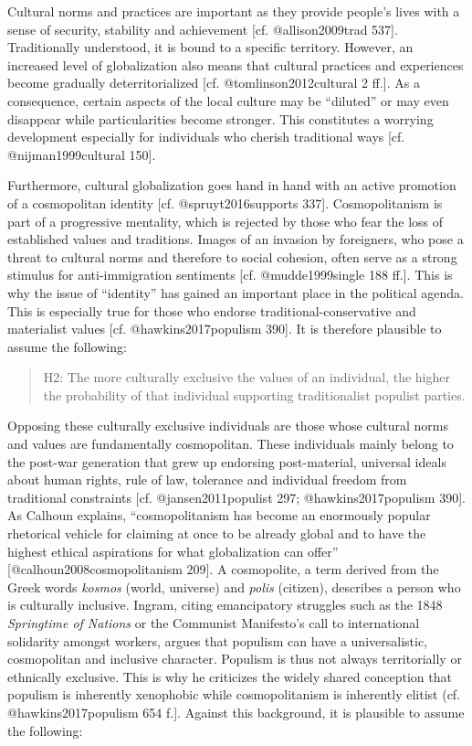 \documentclass[]{article}
\begin{document}
Cultural norms and practices are important as they provide people's
lives with a sense of security, stability and achievement {[}cf.
@allison2009trad 537{]}. Traditionally understood, it is bound to a
specific territory. However, an increased level of globalization also
means that cultural practices and experiences become gradually
deterritorialized {[}cf. @tomlinson2012cultural 2 ff.{]}. As a
consequence, certain aspects of the local culture may be ``diluted'' or
may even disappear while particularities become stronger. This
constitutes a worrying development especially for individuals who
cherish traditional ways {[}cf. @nijman1999cultural 150{]}.

Furthermore, cultural globalization goes hand in hand with an active
promotion of a cosmopolitan identity {[}cf. @spruyt2016supports 337{]}.
Cosmopolitanism is part of a progressive mentality, which is rejected by
those who fear the loss of established values and traditions. Images of
an invasion by foreigners, who pose a threat to cultural norms and
therefore to social cohesion, often serve as a strong stimulus for
anti-immigration sentiments {[}cf. @mudde1999single 188 ff.{]}. This is
why the issue of ``identity'' has gained an important place in the
political agenda. This is especially true for those who endorse
traditional-conservative and materialist values {[}cf.
@hawkins2017populism 390{]}. It is therefore plausible to assume the
following:

\begin{quote}
H2: The more culturally exclusive the values of an individual, the
higher the probability of that individual supporting traditionalist
populist parties.
\end{quote}

Opposing these culturally exclusive individuals are those whose cultural
norms and values are fundamentally cosmopolitan. These individuals
mainly belong to the post-war generation that grew up endorsing
post-material, universal ideals about human rights, rule of law,
tolerance and individual freedom from traditional constraints {[}cf.
@jansen2011populist 297; @hawkins2017populism 390{]}. As Calhoun
explains, ``cosmopolitanism has become an enormously popular rhetorical
vehicle for claiming at once to be already global and to have the
highest ethical aspirations for what globalization can offer''
{[}@calhoun2008cosmopolitanism 209{]}. A cosmopolite, a term derived
from the Greek words \emph{kosmos} (world, universe) and \emph{polis}
(citizen), describes a person who is culturally inclusive. Ingram,
citing emancipatory struggles such as the 1848 \emph{Springtime of
Nations} or the Communist Manifesto's call to international solidarity
amongst workers, argues that populism can have a universalistic,
cosmopolitan and inclusive character. Populism is thus not always
territorially or ethnically exclusive. This is why he criticizes the
widely shared conception that populism is inherently xenophobic while
cosmopolitanism is inherently elitist (cf. @hawkins2017populism 654
f.{]}. Against this background, it is plausible to assume the following:
\end{document}
